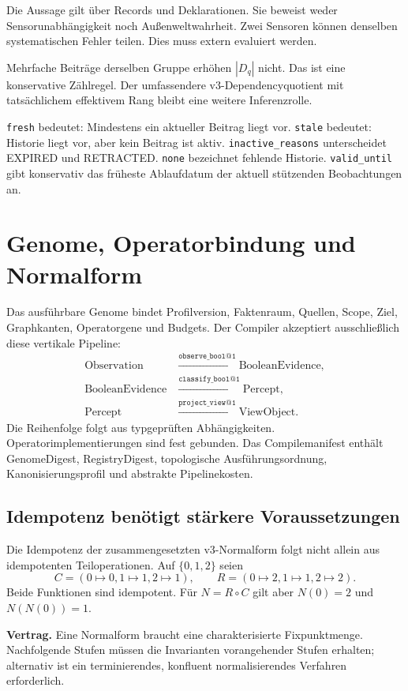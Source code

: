 \documentclass[11pt,a4paper]{article}
\newcommand{\contract}[1]{\vspace{3pt}\noindent\colorbox{pale}{\parbox{\dimexpr\linewidth-2\fboxsep}{\textbf{Vertrag.} #1}}\vspace{5pt}}
\newcommand{\nextsection}[2]{\clearpage{\color{accent}\small\textsf{#1}}\section{#2}}
\begin{document}
Die Aussage gilt über Records und Deklarationen. Sie beweist weder
Sensorunabhängigkeit noch Außenweltwahrheit. Zwei Sensoren können
denselben systematischen Fehler teilen. Dies muss extern evaluiert werden.

Mehrfache Beiträge derselben Gruppe erhöhen $|D_q|$ nicht.
Das ist eine konservative Zählregel. Der umfassendere v3-Dependencyquotient
mit tatsächlichem effektivem Rang bleibt eine weitere Inferenzrolle.

\texttt{fresh} bedeutet: Mindestens ein aktueller Beitrag liegt vor.
\texttt{stale} bedeutet: Historie liegt vor, aber kein Beitrag ist aktiv.
\texttt{inactive\_reasons} unterscheidet EXPIRED und RETRACTED.
\texttt{none} bezeichnet fehlende Historie.
\texttt{valid\_until} gibt konservativ das früheste Ablaufdatum
der aktuell stützenden Beobachtungen an.

\nextsection{06 / KOMPILATION}{Genome, Operatorbindung und Normalform}
Das ausführbare Genome bindet Profilversion, Faktenraum, Quellen,
Scope, Ziel, Graphkanten, Operatorgene und Budgets.
Der Compiler akzeptiert ausschließlich diese vertikale Pipeline:
\begin{align*}
\mathrm{Observation}&\xrightarrow{\texttt{observe\_bool@1}}\mathrm{BooleanEvidence},\\
\mathrm{BooleanEvidence}&\xrightarrow{\texttt{classify\_bool@1}}\mathrm{Percept},\\
\mathrm{Percept}&\xrightarrow{\texttt{project\_view@1}}\mathrm{ViewObject}.
\end{align*}
Die Reihenfolge folgt aus typgeprüften Abhängigkeiten.
Operatorimplementierungen sind fest gebunden. Das Compilemanifest
enthält GenomeDigest, RegistryDigest, topologische Ausführungsordnung,
Kanonisierungsprofil und abstrakte Pipelinekosten.

\subsection{Idempotenz benötigt stärkere Voraussetzungen}
Die Idempotenz der zusammengesetzten v3-Normalform folgt nicht
allein aus idempotenten Teiloperationen. Auf $\{0,1,2\}$ seien
\[
C=(0\mapsto0,1\mapsto1,2\mapsto1),\qquad
R=(0\mapsto2,1\mapsto1,2\mapsto2).
\]
Beide Funktionen sind idempotent. Für $N=R\circ C$ gilt aber
$N(0)=2$ und $N(N(0))=1$.

\contract{Eine Normalform braucht eine charakterisierte Fixpunktmenge.
Nachfolgende Stufen müssen die Invarianten vorangehender Stufen
erhalten; alternativ ist ein terminierendes, konfluent normalisierendes
Verfahren erforderlich.}
\end{document}

